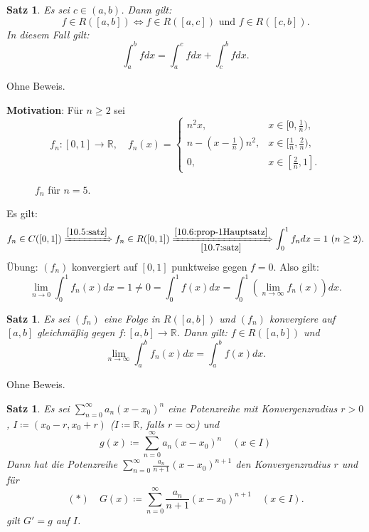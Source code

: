 \documentclass[12pt]{extreport} %
\newcommand{\R}{\mathbb{R}}
\theoremstyle{named}
\theoremstyle{itshape}
\newtheorem{satz}[unnamedtheorem]{Satz}
\theoremstyle{normal}
\begin{document}
{\begin{satz} \label{10.7:satz}
	Es sei $c \in (a, b)$. Dann gilt:
	$$  f \in R([a, b]) \iff f \in R([a, c]) \text{ und } f \in R([c, b]). $$	
	In diesem Fall gilt: $$ \int_{a}^{b} f dx = \int_{a}^{c} f dx + \int_{c}^{b} f dx.$$ 
\end{satz}

Ohne Beweis.

\textbf{Motivation}: Für $n \geq 2$ sei 
	$$f_{n} \colon [0, 1] \rightarrow \R,  \quad f_{n}(x) = \begin{cases} n^{2} x, & x \in [0, \frac{1}{n}), \\ n - (x - \frac{1}{n}) n^{2}, & x \in [\frac{1}{n}, \frac{2}{n}), \\ 
	0, & x \in [\frac{2}{n}, 1]. \end{cases} $$


\begin{figure*}[!ht] \centering
	\caption{$f_{n}$ für $n = 5$.}	
\end{figure*}

Es gilt: $$f_{n} \in C([0, 1]) \xRightarrow[]{\ref{10.5:satz}} f_{n} \in R([0, 1]) \xRightarrow[\ref{10.7:satz}]{\ref{10.6:prop-1Hauptsatz}} \int_{0}^{1} f_{n} dx = 1 ~(n \geq 2).$$
Übung: $(f_{n})$ konvergiert auf $[0, 1]$ punktweise gegen $f = 0$. Also gilt: 
	$$ \lim_{n \rightarrow 0} \int_{0}^{1} f_{n}(x) dx = 1 \neq 0 = \int_{0}^{1} f(x) dx = \int_{0}^{1} \left( \lim_{n \rightarrow \infty} f_{n}(x) \right) dx. $$

\begin{satz} \label{10.8:satz}
	Es sei $(f_{n})$ eine Folge in $R([a, b])$ und $(f_{n})$ konvergiere auf $[a, b]$ gleichmä{\ss}ig gegen $f \colon [a, b] \rightarrow \R$. Dann gilt: $f \in R([a, b])$ und
	$$ \lim_{n \rightarrow \infty} \int_{a}^{b} f_{n}(x) dx = \int_{a}^{b} f(x) dx. $$
\end{satz}

Ohne Beweis.

\begin{satz} \label{10.9:satz}
	Es sei $\sum_{n=0}^{\infty} a_{n} (x - x_{0})^{n}$ eine Potenzreihe mit Konvergenzradius $r > 0$, $I \coloneqq (x_{0} - r, x_{0} + r)$ ($I \coloneqq \R$, falls $r = \infty$) 
	und
	$$ g(x) \coloneqq \sum_{n=0}^{\infty} a_{n} (x - x_{0})^{n} \quad (x \in I) $$
	Dann hat die Potenzreihe $\sum_{n=0}^{\infty} \frac{a_{n}}{n + 1} (x - x_{0})^{n+1}$ den Konvergenzradius $r$ und für
	$$
	(\ast) \quad G(x) \coloneqq \sum_{n=0}^{\infty} \frac{a_{n}}{n + 1} (x - x_{0})^{n+1} \quad (x \in I). 
	$$
	gilt $G' = g$ auf $I$.
\end{satz}

}
\end{document}
